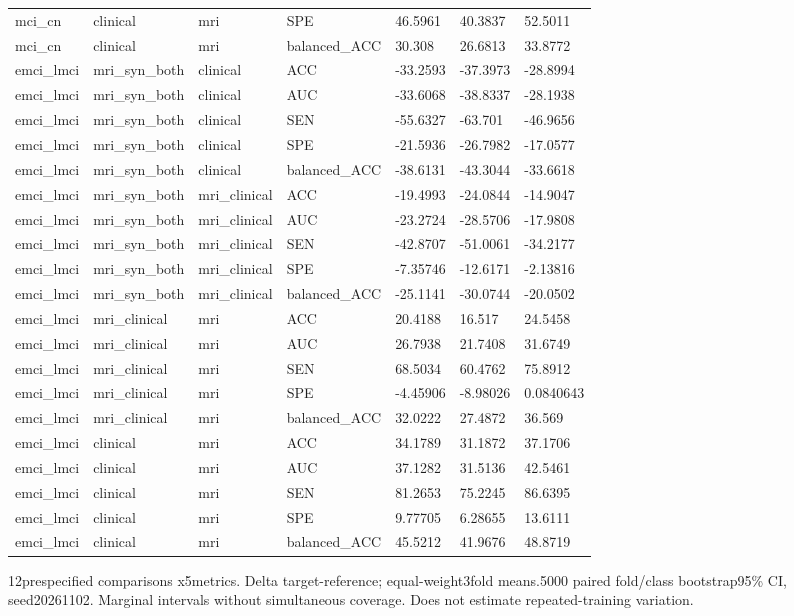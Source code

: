 \documentclass{article}
\providecommand{\DIFaddtex}[1]{{\protect\color{blue} \sf #1}} %
\providecommand{\DIFadd}[1]{\texorpdfstring{\DIFaddtex{#1}}{#1}} %
\begin{document}
\begin{landscape}
\begin{longtable}{lllllll}
mci\_cn & clinical & mri & SPE & 46.5961 & 40.3837 & 52.5011 \\
mci\_cn & clinical & mri & balanced\_ACC & 30.308 & 26.6813 & 33.8772 \\
emci\_lmci & mri\_syn\_both & clinical & ACC & -33.2593 & -37.3973 & -28.8994 \\
emci\_lmci & mri\_syn\_both & clinical & AUC & -33.6068 & -38.8337 & -28.1938 \\
emci\_lmci & mri\_syn\_both & clinical & SEN & -55.6327 & -63.701 & -46.9656 \\
emci\_lmci & mri\_syn\_both & clinical & SPE & -21.5936 & -26.7982 & -17.0577 \\
emci\_lmci & mri\_syn\_both & clinical & balanced\_ACC & -38.6131 & -43.3044 & -33.6618 \\
emci\_lmci & mri\_syn\_both & mri\_clinical & ACC & -19.4993 & -24.0844 & -14.9047 \\
emci\_lmci & mri\_syn\_both & mri\_clinical & AUC & -23.2724 & -28.5706 & -17.9808 \\
emci\_lmci & mri\_syn\_both & mri\_clinical & SEN & -42.8707 & -51.0061 & -34.2177 \\
emci\_lmci & mri\_syn\_both & mri\_clinical & SPE & -7.35746 & -12.6171 & -2.13816 \\
emci\_lmci & mri\_syn\_both & mri\_clinical & balanced\_ACC & -25.1141 & -30.0744 & -20.0502 \\
emci\_lmci & mri\_clinical & mri & ACC & 20.4188 & 16.517 & 24.5458 \\
emci\_lmci & mri\_clinical & mri & AUC & 26.7938 & 21.7408 & 31.6749 \\
emci\_lmci & mri\_clinical & mri & SEN & 68.5034 & 60.4762 & 75.8912 \\
emci\_lmci & mri\_clinical & mri & SPE & -4.45906 & -8.98026 & 0.0840643 \\
emci\_lmci & mri\_clinical & mri & balanced\_ACC & 32.0222 & 27.4872 & 36.569 \\
emci\_lmci & clinical & mri & ACC & 34.1789 & 31.1872 & 37.1706 \\
emci\_lmci & clinical & mri & AUC & 37.1282 & 31.5136 & 42.5461 \\
emci\_lmci & clinical & mri & SEN & 81.2653 & 75.2245 & 86.6395 \\
emci\_lmci & clinical & mri & SPE & 9.77705 & 6.28655 & 13.6111 \\
emci\_lmci & clinical & mri & balanced\_ACC & 45.5212 & 41.9676 & 48.8719 \\
\end{longtable}
\noindent\parbox{\linewidth}{\footnotesize \DIFadd{12prespecified comparisons x5metrics. Delta target-reference; equal-weight3fold means.5000 paired fold/class bootstrap95\% CI, seed20261102. Marginal intervals without simultaneous coverage. Does not estimate repeated-training variation.}}
\endgroup
\end{landscape}
\end{document}
